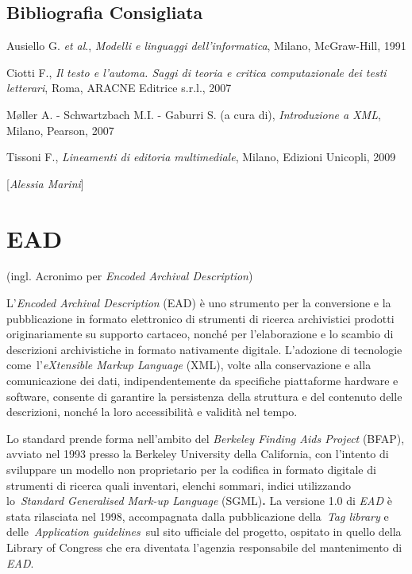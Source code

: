 {\section*{Bibliografia Consigliata}
{\parindent0pt 
Ausiello G. \emph{et al}., \emph{Modelli e linguaggi dell'informatica},
Milano, McGraw-Hill, 1991

Ciotti F., \emph{Il testo e l'automa. Saggi di teoria e critica
computazionale dei testi letterari}, Roma, ARACNE Editrice s.r.l., 2007

Møller A. - Schwartzbach M.I. - Gaburri S. (a cura di),
\emph{Introduzione a XML}, Milano, Pearson, 2007

Tissoni F., \emph{Lineamenti di editoria multimediale}, Milano, Edizioni
Unicopli, 2009
}

\hrulefill 

{[}\emph{Alessia Marini}{]}


\chapter{EAD}

(ingl. Acronimo per \emph{Encoded Archival Description})

L'\emph{Encoded Archival Description} (EAD) è uno strumento per la
conversione e la pubblicazione in formato elettronico di strumenti di
ricerca archivistici prodotti originariamente su supporto cartaceo,
nonché per l'elaborazione e lo scambio di descrizioni archivistiche in
formato nativamente digitale. L'adozione di tecnologie
come~l'\emph{eXtensible Markup Language} (XML), volte alla conservazione
e alla comunicazione dei dati, indipendentemente da specifiche
piattaforme hardware e software, consente di garantire la persistenza
della struttura e del contenuto delle descrizioni, nonché la loro
accessibilità e validità nel tempo.

Lo standard prende forma nell'ambito del \emph{Berkeley Finding Aids
Project} (BFAP), avviato nel 1993 presso la Berkeley University della
California, con l'intento di sviluppare un modello non proprietario per
la codifica in formato digitale di strumenti di ricerca quali inventari,
elenchi sommari, indici utilizzando lo~\emph{Standard Generalised
Mark-up Language} (SGML)\textbf{.} La versione 1.0 di \emph{EAD} è stata
rilasciata nel 1998, accompagnata dalla pubblicazione della~\emph{Tag
library} e delle~\emph{Application guidelines}~sul sito ufficiale del
progetto, ospitato in quello della Library of Congress che era diventata
l'agenzia responsabile del mantenimento di \emph{EAD}.

}

